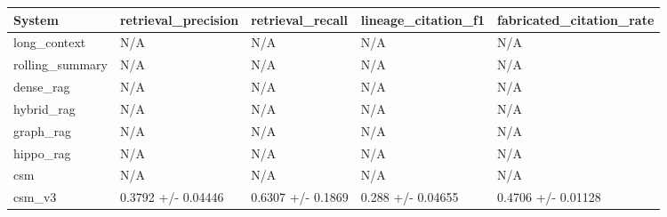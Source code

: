 \begin{tabular}{lllll}
System & retrieval_precision & retrieval_recall & lineage_citation_f1 & fabricated_citation_rate \\
\hline
long\_context & N/A & N/A & N/A & N/A \\
rolling\_summary & N/A & N/A & N/A & N/A \\
dense\_rag & N/A & N/A & N/A & N/A \\
hybrid\_rag & N/A & N/A & N/A & N/A \\
graph\_rag & N/A & N/A & N/A & N/A \\
hippo\_rag & N/A & N/A & N/A & N/A \\
csm & N/A & N/A & N/A & N/A \\
csm\_v3 & 0.3792 +/- 0.04446 & 0.6307 +/- 0.1869 & 0.288 +/- 0.04655 & 0.4706 +/- 0.01128 \\
\end{tabular}
